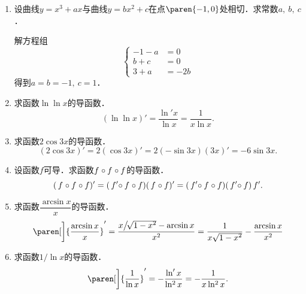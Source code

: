 \begin{enumerate}
\item 设曲线\(y = x^3 + ax\)与曲线\(y = bx^2 + c\)在点\(\paren{-1,0}\)处相切．求常数\(a,\ b,\ c\)．

  \ifshowsol
    解方程组
    \begin{equation*}
      \left\{
        \begin{aligned}
          -1 - a &= 0 \\
          b + c &= 0 \\
          3 + a &= -2b
        \end{aligned}
      \right.
    \end{equation*}
    得到\(a = b = -1,\ c = 1\)．
  \fi

\item 求函数\(\ln\ln x\)的导函数．
  \ifshowsol
    \begin{equation*}
      (\ln\ln x)'
      = \frac{\ln' x}{\ln x}
      = \frac{1}{x \ln x}.
    \end{equation*}
  \fi

\item 求函数\(2\cos3x\)的导函数．
  \ifshowsol
    \begin{equation*}
      (2\cos3x)' = 2(\cos3x)' = 2(-\sin3x)(3x)' = -6\sin3x.
    \end{equation*}
  \fi

\item 设函数\(f\)可导．求函数\(f\mkern1mu \circ f\mkern1mu \circ f\)的导函数．
  \ifshowsol
    \begin{equation*}
      (\,f\mkern1mu \circ f\mkern1mu \circ f)'
      = (\,f'\mkern-4mu \circ f\mkern1mu \circ f) (\,f\mkern1mu \circ f)'
      = (\,f'\mkern-4mu \circ f\mkern1mu \circ f) (\,f'\mkern-4mu \circ f) \,f'.
    \end{equation*}
  \fi

\item 求函数\(\dfrac{\arcsin x}{x}\)的导函数．
  \ifshowsol
    \begin{equation*}
      \paren[\bigg]{\frac{\arcsin x}{x}}'
      = \frac{x\big/\!\sqrt{1-\smash{x^2}} - \arcsin x}{x^2}
      = \frac{1}{x \sqrt{1-\smash{x^2}}} - \frac{\arcsin x}{x^2}
    \end{equation*}
  \fi

\item 求函数\(1/\!\ln x\)的导函数．
  \ifshowsol
    \begin{equation*}
      \paren[\bigg]{\frac1{\ln x}}'
      = - \frac{\ln'x}{\operatorname{ln^2} x}
      = - \frac{1}{x \operatorname{ln^2} x}.
    \end{equation*}
  \fi


\end{enumerate}
